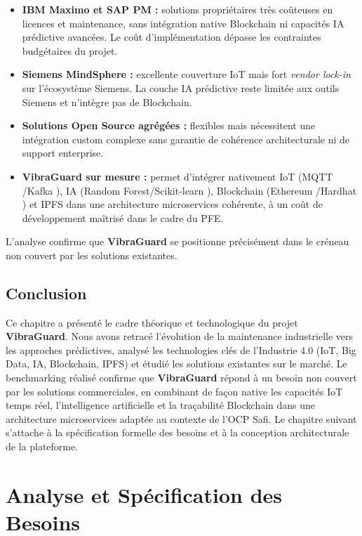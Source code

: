 \documentclass[12pt, a4paper, oneside]{report}
\newcommand{\projectname}{\textbf{VibraGuard}}
\begin{document}
\begin{itemize}
  \item \textbf{IBM Maximo et SAP PM :} solutions propriétaires très coûteuses en licences et
  maintenance, sans intégration native Blockchain ni capacités IA prédictive avancées.
  Le coût d'implémentation dépasse les contraintes budgétaires du projet.
  \item \textbf{Siemens MindSphere :} excellente couverture IoT mais fort \textit{vendor lock-in}
  sur l'écosystème Siemens. La couche IA prédictive reste limitée aux outils Siemens et n'intègre
  pas de Blockchain.
  \item \textbf{Solutions Open Source agrégées :} flexibles mais nécessitent une intégration
  custom complexe sans garantie de cohérence architecturale ni de support enterprise.
  \item \textbf{\projectname{} sur mesure :} permet d'intégrer nativement IoT (MQTT \cite{mqtt}/Kafka
  \cite{kafka}), IA (Random Forest/Scikit-learn \cite{breiman2001, sklearn}), Blockchain
  (Ethereum \cite{ethereum}/Hardhat \cite{hardhat}) et IPFS \cite{ipfs} dans une architecture
  microservices \cite{springboot} cohérente, à un coût de développement maîtrisé dans le cadre du PFE.
\end{itemize}

L'analyse confirme que \projectname{} se positionne précisément dans le créneau non couvert
par les solutions existantes.

\section{Conclusion}

Ce chapitre a présenté le cadre théorique et technologique du projet \projectname{}. Nous
avons retracé l'évolution de la maintenance industrielle vers les approches prédictives, analysé
les technologies clés de l'Industrie 4.0 (IoT, Big Data, IA, Blockchain, IPFS) et étudié les
solutions existantes sur le marché. Le benchmarking réalisé confirme que \projectname{} répond
à un besoin non couvert par les solutions commerciales, en combinant de façon native les
capacités IoT temps réel, l'intelligence artificielle et la traçabilité Blockchain dans une
architecture microservices adaptée au contexte de l'OCP Safi. Le chapitre suivant s'attache
à la spécification formelle des besoins et à la conception architecturale de la plateforme.

\chapter{Analyse et Spécification des Besoins}
\end{document}
